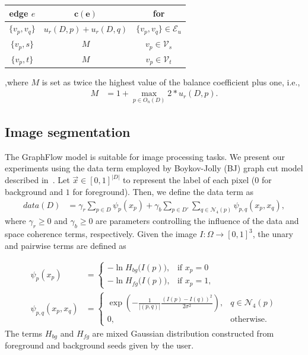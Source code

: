 \documentclass[runningheads]{llncs}
\newcommand{\daniel}[1]{ {\color{blue}#1} }
\begin{document}
\begin{center}
\begin{tabular}{|c|c|c|}
\hline
\textbf{edge} $e$ & $\mathbf{c(e)}$ & \textbf{for}\\
\hline
$\{v_p, v_q\}$ & $ u_r(D,p) + u_r(D,q) $ & $\{v_p,v_q\} \in \mathcal{E}_{u}$\\
\hline
$\{v_p, s\}$ & $M$ & $v_p \in \mathcal{V}_{s}$ \\
\hline
$\{v_p, t\}$ & $M$ & $v_p \in \mathcal{V}_{t}$ \\
\hline
\end{tabular}
\end{center}


,where $M$ is set as twice the highest value of the balance coefficient plus one, i.e.,
\begin{align*}
	M &= 1+\max_{p \in O_n(D)} 2*u_r(D,p).
\end{align*}
%

\daniel{\subsection{Image segmentation}
The GraphFlow model is suitable for image processing tasks. We present our experiments using the data term employed by Boykov-Jolly (BJ) graph cut model described in~\cite{boykov01graphcut}. Let $\vec{x} \in [0,1]^{|D|}$ to represent the label of each pixel ($0$ for background and $1$ for foreground). Then, we define the data term as
%
\begin{align*}
	data(D) &= \gamma_r \sum_{p \in D}{ \psi_p(x_p) } + \gamma_b \sum_{p \in D'}\sum_{q \in \mathcal{N}_{4}(p)}{\psi_{p,q}(x_p,x_q)},
\end{align*}
where $\gamma_r \geq 0$ and $\gamma_b \geq 0$ are parameters controlling the influence of the data and space coherence terms, respectively. Given the image $I:\Omega \rightarrow [0,1]^3$, the unary and pairwise terms are defined as}
\begin{align*}
	\psi_p(x_p) &= \left\{ \begin{array}{ll}
	-\ln  H_{bg}\big( I(p) \big), & \text{if } x_p=0  \\[1em]	
	-\ln  H_{fg}\big( I(p) \big), & \text{if } x_p=1,
	\end{array}\right.\\[1em]
	\psi_{p,q}(x_p,x_q) &= \left\{ \begin{array}{ll}
	\displaystyle \exp{ \left(- \frac{1}{ |(p,q)| }\frac{(I(p) - I(q))^2}{2\sigma^2} \right) }, & q \in \mathcal{N}_4(p) \\[1em]
	0, & \text{otherwise}.
	\end{array}\right.
\end{align*}
%
\daniel{The terms $H_{bg}$ and $H_{fg}$ are mixed Gaussian distribution constructed from foreground and background seeds given by the user. }
%
%
\end{document}
